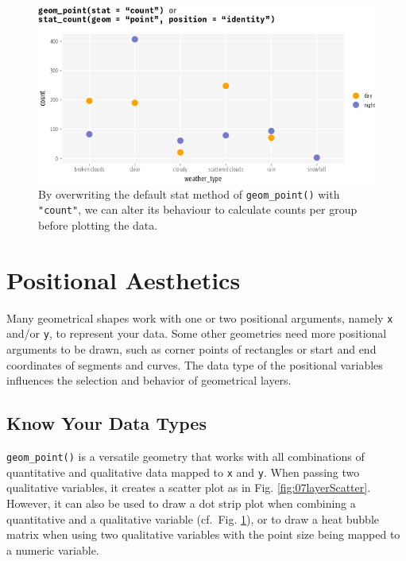 \documentclass[
]{krantz}
\begin{document}
\begin{figure}
\centering
\includegraphics{bookdown_files/figure-latex/07layerPredefinedCustomPointsCount-1.png}
\caption{\label{fig:07layerPredefinedCustomPointsCount}By overwriting the default stat method of \texttt{geom\_point()} with \texttt{"count"}, we can alter its behaviour to calculate counts per group before plotting the data.}
\end{figure}

\hypertarget{positional-aesthetics}{%
\section{Positional Aesthetics}\label{positional-aesthetics}}

Many geometrical shapes work with one or two positional arguments, namely \texttt{x} and/or \texttt{y}, to represent your data. Some other geometries need more positional arguments to be drawn, such as corner points of rectangles or start and end coordinates of segments and curves. The data type of the positional variables influences the selection and behavior of geometrical layers.

\hypertarget{know-your-data-types}{%
\subsection{Know Your Data Types}\label{know-your-data-types}}

\texttt{geom\_point()} is a versatile geometry that works with all combinations of quantitative and qualitative data mapped to \texttt{x} and \texttt{y}. When passing two qualitative variables, it creates a scatter plot as in Fig. \ref{fig:07layerScatter}. However, it can also be used to draw a dot strip plot when combining a quantitative and a qualitative variable (cf.~Fig. \ref{fig:07layerPredefinedCustomPointsCount}), or to draw a heat bubble matrix when using two qualitative variables with the point size being mapped to a numeric variable.
\end{document}
